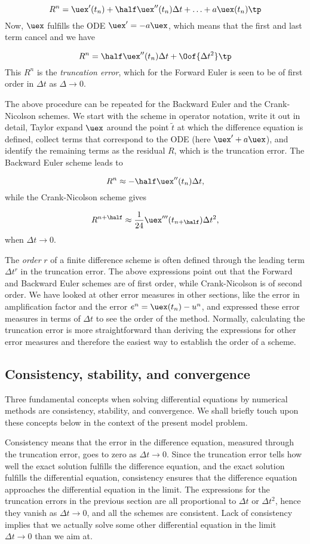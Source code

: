 \documentclass[graybox,sectrefs,envcountresetchap,open=right,final]{svmonodo}
\begin{document}
\[ R^n = \uex'(t_n) + \half\uex''(t_n)\Delta t + \ldots + a\uex(t_n)\tp\]
Now, $\uex$ fulfills the ODE $\uex'=-a\uex$, which means that the first and last
term cancel and we have

\[ R^n = \half\uex''(t_n)\Delta t + \Oof{\Delta t^2}\tp \]
This $R^n$ is the \emph{truncation error}, which for the Forward Euler is seen
to be of first order in $\Delta t$ as $\Delta \rightarrow 0$.

The above procedure can be repeated for the Backward Euler and the
Crank-Nicolson schemes. We start with the scheme in operator notation,
write it out in detail, Taylor expand $\uex$ around the point $\tilde t$
at which the difference equation is defined, collect terms that
correspond to the ODE (here $\uex' + a\uex$), and identify the remaining
terms as the residual $R$, which is the truncation error.
The Backward Euler scheme leads to

\[ R^n \approx -\half\uex''(t_n)\Delta t, \]
while the Crank-Nicolson scheme gives

\[ R^{n+\half} \approx \frac{1}{24}\uex'''(t_{n+\half})\Delta t^2,\]
when $\Delta t\rightarrow 0$.

The \emph{order} $r$ of a finite difference scheme is often defined through
the leading term $\Delta t^r$ in the truncation error. The above
expressions point out that the Forward and Backward Euler schemes are
of first order, while Crank-Nicolson is of second order.  We have
looked at other error measures in other sections, like the error in
amplification factor and the error $e^n=\uex(t_n)-u^n$, and expressed
these error measures in terms of $\Delta t$ to see the order of the
method. Normally, calculating the truncation error is more
straightforward than deriving the expressions for other error measures
and therefore the easiest way to establish the order of a scheme.

\subsection{Consistency, stability, and convergence}

  

Three fundamental concepts when solving differential equations by
numerical methods are consistency, stability, and convergence.  We
shall briefly touch upon these concepts below in the context of the present
model problem.

Consistency means that the error in the difference equation, measured
through the truncation error, goes to zero as $\Delta t\rightarrow
0$. Since the truncation error tells how well the exact solution
fulfills the difference equation, and the exact solution fulfills the
differential equation, consistency ensures that the difference
equation approaches the differential equation in the limit. The
expressions for the truncation errors in the previous section are all
proportional to $\Delta t$ or $\Delta t^2$, hence they vanish as
$\Delta t\rightarrow 0$, and all the schemes are consistent.  Lack of
consistency implies that we actually solve some other differential
equation in the limit $\Delta t\rightarrow 0$ than we aim at.
\end{document}
